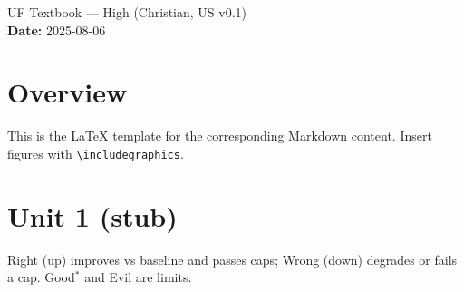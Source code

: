 \documentclass[11pt]{article}
\begin{document}
\begin{center}
{\LARGE UF Textbook — High (Christian, US v0.1) }\\[6pt]
\textbf{Date: }2025-08-06
\end{center}

\section*{Overview}
This is the LaTeX template for the corresponding Markdown content. Insert figures with \texttt{\textbackslash includegraphics}.

\section*{Unit 1 (stub)}
Right (up) improves vs baseline and passes caps; Wrong (down) degrades or fails a cap. Good$^\ast$ and Evil are limits.
\end{document}
